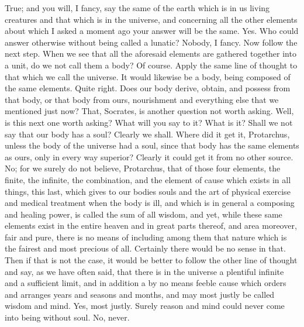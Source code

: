 \documentclass[letterpaper,12pt]{article}
\newcommand{\stephpag}[1]{\marginnote{\small\itshape\fontfamily{ppl}\selectfont #1}}
\begin{document}
\begin{drama}
\socratesspeaks
True; and you will, I fancy, say the same of the earth which is in us living creatures and that which is in the universe, and concerning all the other elements about which I asked a moment ago your answer will be the same.
\protarchusspeaks
Yes. Who could answer otherwise without being called a lunatic?
\socratesspeaks
Nobody, I fancy. Now follow the next step. When we see that all the aforesaid elements are gathered together into a unit, do we not call them a body?
\protarchusspeaks
Of course. \stephpag{e}
\socratesspeaks
Apply the same line of thought to that which we call the universe. It would likewise be a body, being composed of the same elements.
\protarchusspeaks
Quite right.
\socratesspeaks
Does our body derive, obtain, and possess from that body, or that body from ours, nourishment and everything else that we mentioned just now?
\protarchusspeaks
That, Socrates, is another question not worth asking. \stephpag{30 a}
\socratesspeaks
Well, is this next one worth asking? What will you say to it?
\protarchusspeaks
What is it?
\socratesspeaks
Shall we not say that our body has a soul?
\protarchusspeaks
Clearly we shall.
\socratesspeaks
Where did it get it, Protarchus, unless the body of the universe had a soul, since that body has the same elements as ours, only in every way superior?
\protarchusspeaks
Clearly it could get it from no other source.
\socratesspeaks
No; for we surely do not believe, Protarchus, that of those four elements, the finite, the infinite, the combination, \stephpag{b} and the element of cause which exists in all things, this last, which gives to our bodies souls and the art of physical exercise and medical treatment when the body is ill, and which is in general a composing and healing power, is called the sum of all wisdom, and yet, while these same elements exist in the entire heaven and in great parts thereof, and area moreover, fair and pure, there is no means of including among them that nature which is the fairest and most precious of all. \stephpag{c}
\protarchusspeaks
Certainly there would be no sense in that.
\socratesspeaks
Then if that is not the case, it would be better to follow the other line of thought and say, as we have often said, that there is in the universe a plentiful infinite and a sufficient limit, and in addition a by no means feeble cause which orders and arranges years and seasons and months, and may most justly be called wisdom and mind.
\protarchusspeaks
Yes, most justly.
\socratesspeaks
Surely reason and mind could never come into being without soul.
\protarchusspeaks
No, never.
\socratesspeaks

\end{drama}
\end{document}
